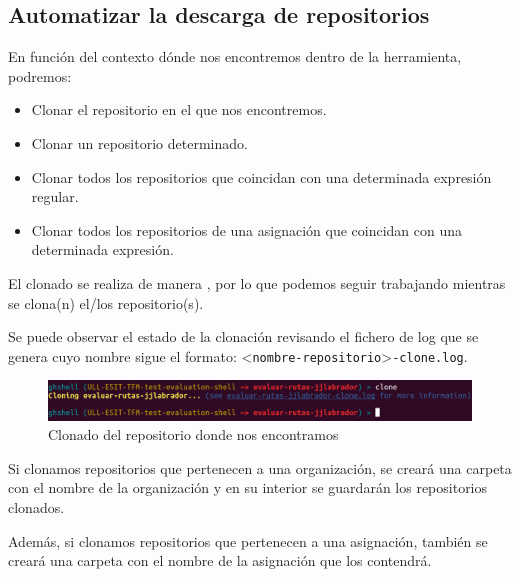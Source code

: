 \subsection{Automatizar la descarga de repositorios}
\label{subsec:3.1.3}  
        	
    En función del contexto dónde nos encontremos dentro de la herramienta, podremos:
    \begin{itemize}
    	\item Clonar el repositorio en el que nos encontremos.
    	\item Clonar un repositorio determinado.
	    \item Clonar todos los repositorios que coincidan con una determinada expresión regular.
	    \item Clonar todos los repositorios de una asignación que coincidan con una determinada expresión.
    \end{itemize}
    
    El clonado se realiza de manera \ceit{\ref{apend1:asincrona}}, por lo que podemos seguir trabajando mientras se clona(n) el/los repositorio(s). 
\bigskip
   
   Se puede observar el estado de la clonación revisando el fichero de log que se genera cuyo nombre sigue el formato: \textless \verb|nombre-repositorio|\textgreater \verb|-clone.log|.
    
    	\begin{figure}[H]
		\begin{center}
		\includegraphics[width=1\textwidth]{images/ghshell6-3}
		\caption{Clonado del repositorio donde nos encontramos}
		\label{fig:ghshell6-3}
		\end{center}
		\end{figure}	

\newpage

    Si clonamos repositorios que pertenecen a una organización, se creará una carpeta con el nombre de la organización y en su interior se guardarán los repositorios clonados.
    		
	Además, si clonamos repositorios que pertenecen a una asignación, también se creará una carpeta con el nombre de la asignación que los contendrá.
	
